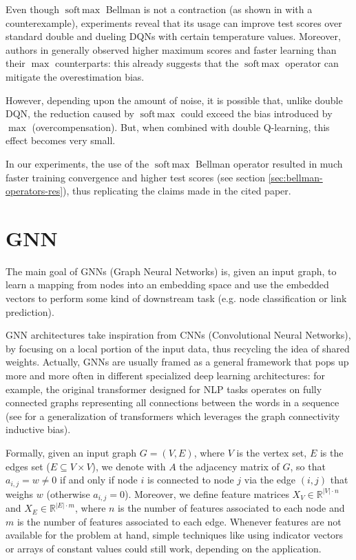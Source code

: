 \documentclass[a4paper,10pt]{report}
\DeclareMathOperator*{\softmax}{soft\,max}
\begin{document}
Even though $\softmax$ Bellman is not a contraction (as shown in \cite{softmax-contraction} with a counterexample), experiments reveal that its usage can improve test scores over standard double and dueling DQNs with certain temperature values. Moreover, authors in \cite{softmax-bellman} generally observed higher maximum scores and faster
learning than their $\max$ counterparts: this already suggests that the $\softmax$ operator can mitigate the overestimation bias.

However, depending upon the amount of noise, it is possible that, unlike double DQN, the reduction caused by $\softmax$ could exceed the bias introduced by $\max$ (overcompensation). But, when combined with double Q-learning, this effect becomes very small.

In our experiments, the use of the $\softmax$ Bellman operator resulted in much faster training convergence and higher test scores (see section \ref{sec:bellman-operators-res}), thus replicating the claims made in the cited paper.

\chapter{GNN}
The main goal of GNNs (Graph Neural Networks) is, given an input graph, to learn a mapping from nodes into an embedding space and use the embedded vectors to perform some kind of downstream task (e.g. node classification or link prediction). 

GNN architectures take inspiration from CNNs (Convolutional Neural Networks), by focusing on a local portion of the input data, thus recycling the idea of shared weights. Actually, GNNs are usually framed as a general framework that pops up more and more often in different specialized deep learning architectures: for example, the original transformer \cite{transformers} designed for NLP tasks operates on fully connected graphs representing all connections between the words in a sequence (see \cite{gnn-transformers} for a generalization of transformers which leverages the graph connectivity inductive bias).

Formally, given an input graph $G=(V,E)$, where $V$ is the vertex set, $E$ is the edges set ($E\subseteq V\times V$), we denote with $A$ the adjacency matrix of $G$, so that $a_{i,j}=w\neq 0$ if and only if node $i$ is connected to node $j$ via the edge $(i, j)$ that weighs $w$ (otherwise $a_{i,j}=0$). Moreover, we define feature matrices $X_V\in \mathbb{R}^{|V|\cdot n}$ and $X_E\in \mathbb{R}^{|E|\cdot m}$, where $n$ is the number of features associated to each node and $m$ is the number of features associated to each edge. Whenever features are not available for the problem at hand, simple techniques like using indicator vectors or arrays of constant values could still work, depending on the application.
\end{document}
